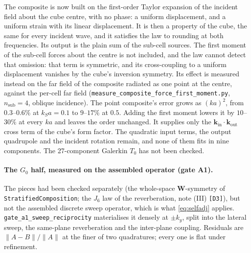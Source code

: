 \documentclass[11pt,a4paper]{article}
\newcommand{\Tz}{T_0}
\newcommand{\Gz}{G_0}
\newcommand{\bW}{\mathbf{W}}
\begin{document}
The composite is now built on the first-order Taylor expansion of the incident field about the
cube centre, with no phase: a uniform displacement, and a uniform strain with its linear
displacement. It is then a property of the cube, the same for every incident wave, and it
satisfies the law to rounding at both frequencies. Its output is the plain sum of the sub-cell
sources. The first moment of the sub-cell forces about the centre is not included, and the law
cannot detect that omission: that term is symmetric, and its cross-coupling to a uniform
displacement vanishes by the cube's inversion symmetry. Its effect is measured instead on the
far field of the composite radiated as one point at the centre, against the per-cell far field
(\nolinkurl{measure_composite_force_first_moment.py}, $n_{\mathrm{sub}}=4$, oblique incidence).
The point composite's error grows as $(ka)^2$, from $0.3$--$0.6\%$ at $k_Sa=0.1$ to $9$--$17\%$
at $0.5$. Adding the first moment lowers it by $10$--$30\%$ at every $ka$ and leaves the order
unchanged. It supplies only the $\mathbf{k}_{\mathrm{in}}\cdot\mathbf{k}_{\mathrm{out}}$ cross
term of the cube's form factor. The quadratic input terms, the output quadrupole and the incident
rotation remain, and none of them fits in nine components. The 27-component Galerkin $\Tz$ has not
been checked.

\paragraph{The $\Gz$ half, measured on the assembled operator (gate A1).} The pieces had been
checked separately (the whole-space $\bW$-symmetry of \texttt{StratifiedComposition}; the $J_6$
law of the reverberation, note (III) \texttt{[D3]}), but not the assembled discrete sweep operator,
which is what \eqref{eq:selfadj} applies. \nolinkurl{gate_a1_sweep_reciprocity} materialises it
densely at $\pm k_y$, split into the lateral sweep, the same-plane reverberation and the
inter-plane coupling. Residuals are $\lVert A - B\rVert/\lVert A\rVert$ at the finer of two
quadratures; every one is flat under refinement.
\end{document}
